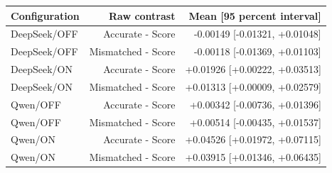 \begin{tabular}{lrr}
\toprule
Configuration & Raw contrast & Mean [95 percent interval] \\
\midrule
DeepSeek/OFF & Accurate - Score & -0.00149 [-0.01321, +0.01048] \\
DeepSeek/OFF & Mismatched - Score & -0.00118 [-0.01369, +0.01103] \\
DeepSeek/ON & Accurate - Score & +0.01926 [+0.00222, +0.03513] \\
DeepSeek/ON & Mismatched - Score & +0.01313 [+0.00009, +0.02579] \\
Qwen/OFF & Accurate - Score & +0.00342 [-0.00736, +0.01396] \\
Qwen/OFF & Mismatched - Score & +0.00514 [-0.00435, +0.01537] \\
Qwen/ON & Accurate - Score & +0.04526 [+0.01972, +0.07115] \\
Qwen/ON & Mismatched - Score & +0.03915 [+0.01346, +0.06435] \\
\bottomrule
\end{tabular}
